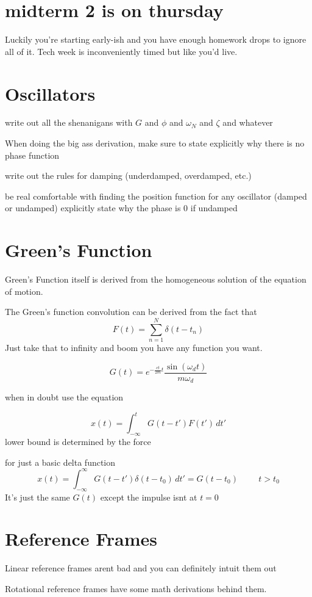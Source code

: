 \documentclass[fleqn]{article}
\date{Fall 2024}
\newcommand{\hp}{\hspace{1cm}}
\begin{document}
\pagestyle{empty}

\section{midterm 2 is on thursday}
Luckily you're starting early-ish and you have enough homework drops to ignore all of it. Tech week is inconveniently timed but like you'd live.

\section{Oscillators}
write out all the shenanigans with $G$ and $\phi$ and $\omega_N$ and $\zeta$ and whatever 

When doing the big ass derivation, make sure to state explicitly why 
there is no phase function 

write out the rules for damping (underdamped, overdamped, etc.)

be real comfortable with finding the position function for any oscillator 
(damped or undamped)
explicitly state why the phase is 0 if undamped 

\section{Green's Function}
Green's Function itself is derived from the homogeneous solution of the equation of 
motion. 

The Green's function convolution can be derived from the fact that 
\[
F(t) = \sum^N_{n = 1} \delta(t - t_n)
\]
Just take that to infinity and boom you have any function you want.

\[
G(t) = e^{- \frac{ct}{2m} t} \frac{\sin(\omega_d t)}{m \omega_d}
\]

when in doubt use the equation 

\[
x(t) = \int^t_{-\infty} G(t - t') F(t') \, dt'
\]
lower bound is determined by the force 

for just a basic delta function 
\[
x(t) = \int^{\infty}_{-\infty} G(t - t') \delta(t - t_0) \, dt' = G(t - t_0)
\hp 
t > t_0
\]
It's just the same $G(t)$ except the impulse isnt at $t = 0$

\section{Reference Frames}
Linear reference frames arent bad and you can definitely intuit them out 

Rotational reference frames have some math derivations behind them. 
\end{document}
